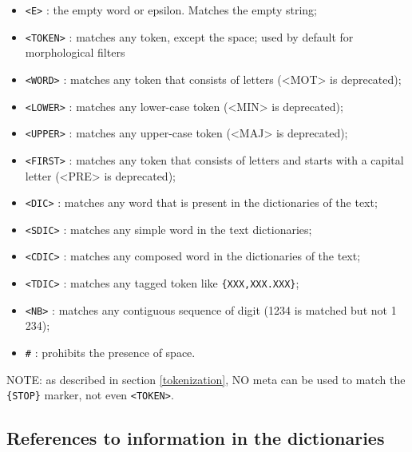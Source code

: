 \bigskip
{}
\index{\verb+#+}
\begin{itemize}
  \item \verb+<E>+ : the empty word or epsilon. Matches the empty string;
  \item \verb+<TOKEN>+ : matches any token, except the space; used by default
  for morphological filters
  \item \verb+<WORD>+ : matches any token that consists of letters (<MOT> is deprecated);
  \item \verb+<LOWER>+ : matches any lower-case token (<MIN> is deprecated);
  \item \verb+<UPPER>+ : matches any upper-case token (<MAJ> is deprecated);
  \item \verb+<FIRST>+ : matches any token that consists of letters and starts
  with a capital letter (<PRE> is deprecated);
  \item \verb+<DIC>+ : matches any word that is present in the dictionaries of
  the text;
  \item \verb+<SDIC>+ : matches any simple word in the text
  dictionaries;
  \item \verb+<CDIC>+ : matches any composed word in the dictionaries of the
  text;
  \item \verb+<TDIC>+ : matches any tagged token like \verb+{XXX,XXX.XXX}+;
  \item \verb+<NB>+ : matches any contiguous sequence of digit (1234 is matched
  but not 1 234);
  \item \verb+#+ : prohibits the presence of space.
\end{itemize}

\bigskip
\noindent NOTE: as described in section \ref{tokenization}, NO meta can be used
to match the \verb+{STOP}+ marker, not even \verb+<TOKEN>+.

\subsection{References to information in the dictionaries}


